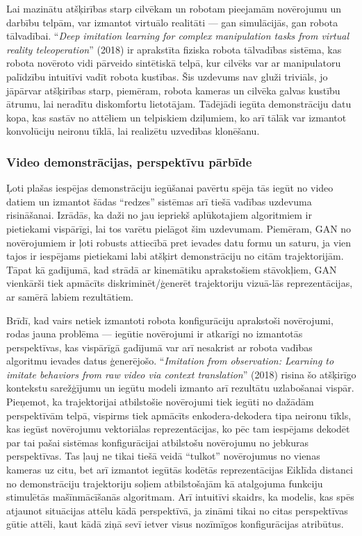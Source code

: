 \documentclass[12pt, a4paper]{article}
\numberwithin{equation}{section} %
\begin{document}
Lai mazinātu atšķirības starp cilvēkam un robotam pieejamām novērojumu un darbību telpām, var izmantot virtuālo realitāti --- gan simulācijās, gan robota tālvadībai. ``\textit{Deep imitation learning for complex manipulation tasks from virtual reality teleoperation}'' \cite{zhang2018deep} (2018) ir aprakstīta fiziska robota tālvadības sistēma, kas robota novēroto vidi pārveido sintētiskā telpā, kur cilvēks var ar manipulatoru palīdzību intuitīvi vadīt robota kustības. Šis uzdevums nav gluži triviāls, jo jāpārvar atšķirības starp, piemēram, robota kameras un cilvēka galvas kustību ātrumu, lai neradītu diskomfortu lietotājam. Tādējādi iegūta demonstrāciju datu kopa, kas sastāv no attēliem un telpiskiem dziļumiem, ko arī tālāk var izmantot konvolūciju neironu tīklā, lai realizētu uzvedības klonēšanu.

\subsubsection{Video demonstrācijas, perspektīvu pārbīde}

Ļoti plašas iespējas demonstrāciju iegūšanai pavērtu spēja tās iegūt no video datiem un izmantot šādas ``redzes'' sistēmas arī tiešā vadības uzdevuma risināšanai. Izrādās, ka daži no jau iepriekš aplūkotajiem algoritmiem ir pietiekami vispārīgi, lai tos varētu pielāgot šim uzdevumam. Piemēram, GAN no novērojumiem \cite{torabi2018generative} ir ļoti robusts attiecībā pret ievades datu formu un saturu, ja vien tajos ir iespējams pietiekami labi atšķirt demonstrāciju no citām trajektorijām. Tāpat kā gadījumā, kad strādā ar kinemātiku aprakstošiem stāvokļiem, GAN vienkārši tiek apmācīts diskriminēt/ģenerēt trajektoriju vizuā-lās reprezentācijas, ar samērā labiem rezultātiem.


Brīdī, kad vairs netiek izmantoti robota konfigurāciju aprakstoši novērojumi, rodas jauna problēma --- iegūtie novērojumi ir atkarīgi no izmantotās perspektīvas, kas vispārīgā gadījumā var arī nesakrist ar robota vadības algoritmu ievades datus ģenerējošo. ``\textit{Imitation from observation: Learning to imitate behaviors from raw video via context translation}'' \cite{liu2018imitation} (2018) risina šo atšķirīgo kontekstu sarežģījumu un iegūtu modeli izmanto arī rezultātu uzlabošanai vispār. Pieņemot, ka trajektorijai atbilstošie novērojumi tiek iegūti no dažādām perspektīvām telpā, vispirms tiek apmācīts enkodera-dekodera tipa neironu tīkls, kas iegūst novērojumu vektoriālas reprezentācijas, ko pēc tam iespējams dekodēt par tai pašai sistēmas konfigurācijai atbilstošu novērojumu no jebkuras perspektīvas. Tas ļauj ne tikai tiešā veidā ``tulkot'' novērojumus no vienas kameras uz citu, bet arī izmantot iegūtās kodētās reprezentācijas Eiklīda distanci no demonstrāciju trajektoriju soļiem atbilstošajām kā atalgojuma funkciju stimulētās mašīnmācīšanās algoritmam. Arī intuitīvi skaidrs, ka modelis, kas spēs atjaunot situācijas attēlu kādā perspektīvā, ja zināmi tikai no citas perspektīvas gūtie attēli, kaut kādā ziņā sevī ietver visus nozīmīgos konfigurācijas atribūtus.
\end{document}
